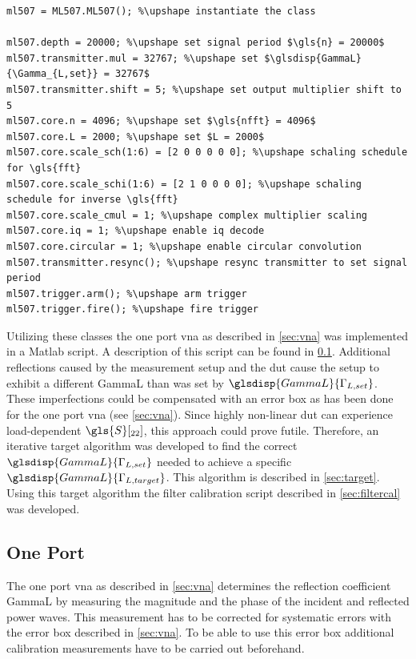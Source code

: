 \documentclass[12pt,a4paper,parskip=full,abstract=true,BCOR=12mm,twoside,open=right]{scrreprt}
\newcommand{\hack}{}
\begin{document}
\begin{lstlisting}[float=htb,caption={Example usage of the Matlab driver for the hardware},label=src:mdriver,basicstyle=\hack\scriptsize,texcl=true]
ml507 = ML507.ML507(); %\upshape instantiate the class

ml507.depth = 20000; %\upshape set signal period $\gls{n} = 20000$
ml507.transmitter.mul = 32767; %\upshape set $\glsdisp{GammaL}{\Gamma_{L,set}} = 32767$
ml507.transmitter.shift = 5; %\upshape set output multiplier shift to 5
ml507.core.n = 4096; %\upshape set $\gls{nfft} = 4096$
ml507.core.L = 2000; %\upshape set $L = 2000$
ml507.core.scale_sch(1:6) = [2 0 0 0 0 0]; %\upshape schaling schedule for \gls{fft}
ml507.core.scale_schi(1:6) = [2 1 0 0 0 0]; %\upshape schaling schedule for inverse \gls{fft}
ml507.core.scale_cmul = 1; %\upshape complex multiplier scaling
ml507.core.iq = 1; %\upshape enable iq decode
ml507.core.circular = 1; %\upshape enable circular convolution
ml507.transmitter.resync(); %\upshape resync transmitter to set signal period
ml507.trigger.arm(); %\upshape arm trigger
ml507.trigger.fire(); %\upshape fire trigger
\end{lstlisting}

Utilizing these classes the one port \gls{vna} as described in \cref{sec:vna}
was implemented in a Matlab script. A description of this script can be found
in \cref{sec:mvna}. Additional reflections caused by the measurement setup and the \gls{dut} cause
the setup to exhibit a different \gls{GammaL} than was set by
$\glsdisp{GammaL}{\Gamma_{L,set}}$. These imperfections could be compensated with an error
box as has been done for the one port \gls{vna} (see \cref{sec:vna}).
Since highly non-linear \gls{dut} can experience load-dependent
$\gls{S}[_{22}]$, this approach could prove futile. Therefore, an iterative target algorithm
was developed to find the correct $\glsdisp{GammaL}{\Gamma_{L,set}}$ needed
to achieve a specific $\glsdisp{GammaL}{\Gamma_{L,target}}$. This algorithm
is described in \cref{sec:target}. Using this target algorithm the
filter calibration script described in \cref{sec:filtercal} was developed.


\subsection{One Port }
\label{sec:mvna}

The one port \gls{vna} as described in \cref{sec:vna} determines the reflection
coefficient \gls{GammaL} by measuring the magnitude and the phase of the incident
and reflected power waves. This measurement has to be corrected for systematic
errors with the error box described in \cref{sec:vna}. To be able to use
this error box additional calibration measurements have to be carried out
beforehand.
\end{document}
